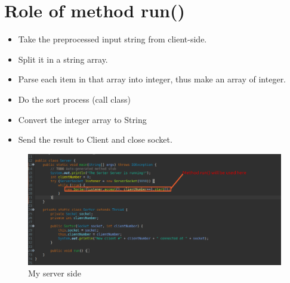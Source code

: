 \documentclass[11pt,a4paper]{article}
\begin{document}
	\section{Role of method run()}
	\begin{itemize}
		\item Take the preprocessed input string from client-side.
		\item Split it in a string array.
		\item Parse each item in that array into integer, thus make an array of integer.
		\item Do the sort process (call class)
		\item Convert the integer array to String
		\item Send the result to Client and close socket.
	\end{itemize}
	\begin{figure}[h!]
  		\includegraphics[width=\linewidth]{server-code.png}
  		\caption{My server side}
  		\label{fig:server}
	\end{figure}
\end{document}
